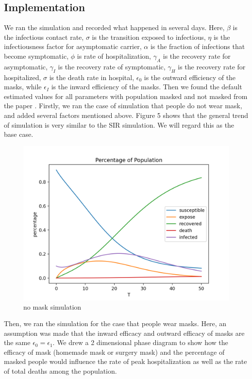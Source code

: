 \documentclass{article}
\begin{document}
 \subsection{Implementation}

 We ran the simulation and recorded what happened in several days. Here, $\beta $ is the infectious contact rate, $\sigma $ is the transition exposed to infectious, $\eta $ is the infectiousness factor for asymptomatic carrier, $\alpha$ is the fraction of infections that become symptomatic, $\phi$ is rate of hospitalization, $\gamma_{A}$ is the recovery rate for asymptomatic, $\gamma_{I}$ is the recovery rate of  symptomatic, $\gamma_{H}$ is the recovery rate for hospitalized, $\sigma$ is the death rate in hospital, $\epsilon_{0}$ is the outward efficiency of the masks, while $\epsilon_{I}$ is the inward efficiency of the masks. Then we found the default estimated values for all parameters with population masked and not masked from the paper \cite{Steff2020mask}. Firstly, we ran the case of simulation that people do not wear mask, and added several factors mentioned above. Figure 5 shows that the general trend of simulation is very similar to the SIR simulation. We will regard this as the base case.


 \begin{figure}[htp]
 \centering
 \includegraphics[width=.3\textwidth]{masksimulation.png}
 \caption{no mask simulation}
 \label{fig:figure5}
 \end{figure}

Then, we ran the simulation for the case that people wear masks.
Here, an assumption was made that the inward efficacy and outward efficacy of masks are the same $\epsilon_{0} = \epsilon_{1}$. We drew a 2 dimensional phase diagram to show how the efficacy of mask (homemade mask or surgery mask) and the percentage of masked people would influence the rate of peak hospitalization as well as the rate of total deaths among the population.
\end{document}

